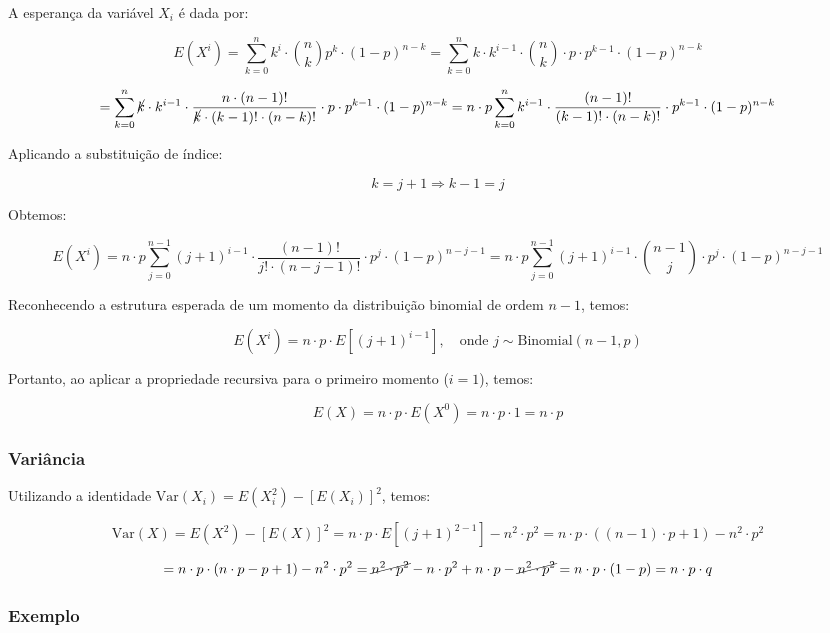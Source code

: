 \documentclass[
]{article}
\begin{document}
A esperança da variável \(X_i\) é dada por:

\[
E(X^i) = \sum_{k=0}^{n} k^i \cdot \binom{n}{k} p^k \cdot (1 - p)^{n - k}
= \sum_{k=0}^{n} k \cdot k^{i-1} \cdot \binom{n}{k} \cdot p \cdot p^{k-1} \cdot (1 - p)^{n - k}
\]

\[
= \sum_{k=0}^{n} \cancel{k} \cdot k^{i-1} \cdot \frac{n \cdot (n - 1)!}{\cancel{k} \cdot (k - 1)! \cdot (n - k)!} 
\cdot p \cdot p^{k-1} \cdot (1 - p)^{n - k}
= n \cdot p \sum_{k=0}^{n} k^{i-1} \cdot \frac{(n - 1)!}{(k - 1)! \cdot (n - k)!} 
\cdot p^{k-1} \cdot (1 - p)^{n - k}
\]

Aplicando a substituição de índice:

\[
k = j + 1 \Rightarrow k - 1 = j
\]

Obtemos:

\[
E(X^i) = n \cdot p \sum_{j=0}^{n-1} (j + 1)^{i-1} \cdot \frac{(n - 1)!}{j! \cdot (n - j - 1)!} 
\cdot p^{j} \cdot (1 - p)^{n - j - 1}
= n \cdot p \sum_{j=0}^{n-1} (j + 1)^{i-1} \cdot \binom{n - 1}{j} \cdot p^{j} \cdot (1 - p)^{n - j - 1}
\]

Reconhecendo a estrutura esperada de um momento da distribuição binomial de ordem \(n-1\), temos:

\[
E(X^i) = n \cdot p \cdot E\left[(j + 1)^{i-1}\right], \quad \text{onde } j \sim \text{Binomial}(n - 1, p)
\]

Portanto, ao aplicar a propriedade recursiva para o primeiro momento (\(i = 1\)), temos:

\[
E(X) = n \cdot p \cdot E(X^{0}) = n \cdot p \cdot 1 = n \cdot p
\]

\hypertarget{variuxe2ncia-1}{%
\subsubsection{Variância}\label{variuxe2ncia-1}}

Utilizando a identidade \(\text{Var}(X_i) = E(X_i^2) - [E(X_i)]^2\), temos:

\[
\text{Var}(X) = E(X^2) - [E(X)]^2 
= n \cdot p \cdot E[(j + 1)^{2 - 1}] - n^2 \cdot p^2 
= n \cdot p \cdot ((n - 1)\cdot p + 1) - n^2 \cdot p^2
\]

\[
= n \cdot p \cdot (n \cdot p - p + 1) - n^2 \cdot p^2 
= \cancel{n^2 \cdot p^2} - n \cdot p^2 + n \cdot p - \cancel{n^2 \cdot p^2} 
= n \cdot p \cdot (1 - p) = n \cdot p \cdot q
\]

\hypertarget{exemplo-binomial}{%
\subsubsection{Exemplo}\label{exemplo-binomial}}
\end{document}

